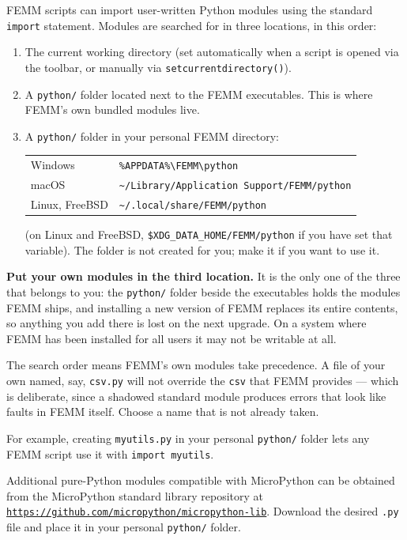 FEMM scripts can import user-written Python modules using the standard
\verb+import+ statement.  Modules are searched for in three locations, in
this order:

\begin{enumerate}
\item The current working directory (set automatically when a script is
      opened via the toolbar, or manually via \verb+setcurrentdirectory()+).
\item A \verb+python/+ folder located next to the FEMM executables.  This
      is where FEMM's own bundled modules live.
\item A \verb+python/+ folder in your personal FEMM directory:

      \begin{tabular}{ll}
      Windows          & \verb+%APPDATA%\FEMM\python+ \\
      macOS            & \verb+~/Library/Application Support/FEMM/python+ \\
      Linux, FreeBSD   & \verb+~/.local/share/FEMM/python+ \\
      \end{tabular}

      \noindent(on Linux and FreeBSD, \verb+$XDG_DATA_HOME/FEMM/python+ if
      you have set that variable).  The folder is not created for you;
      make it if you want to use it.
\end{enumerate}

{\bf Put your own modules in the third location.}  It is the only one of
the three that belongs to you: the \verb+python/+ folder beside the
executables holds the modules FEMM ships, and installing a new version of
FEMM replaces its entire contents, so anything you add there is lost on
the next upgrade.  On a system where FEMM has been installed for all users
it may not be writable at all.

The search order means FEMM's own modules take precedence.  A file of your
own named, say, \verb+csv.py+ will not override the \verb+csv+ that FEMM
provides --- which is deliberate, since a shadowed standard module
produces errors that look like faults in FEMM itself.  Choose a name that
is not already taken.

For example, creating \verb+myutils.py+ in your personal \verb+python/+
folder lets any FEMM script use it with \verb+import myutils+.

Additional pure-Python modules compatible with MicroPython can be obtained
from the MicroPython standard library repository at
\href{https://github.com/micropython/micropython-lib}%
{\tt https://github.com/micropython/micropython-lib}.
Download the desired \verb+.py+ file and place it in your personal
\verb+python/+ folder.

